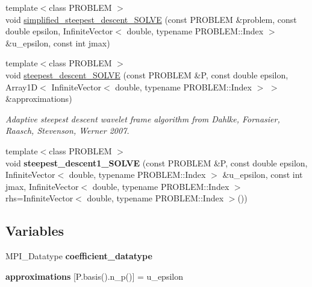 \begin{CompactItemize}
\item 
{\footnotesize template$<$class PROBLEM $>$ }\\void \hyperlink{namespaceFrameTL_c04ff1f80c162c3369928a2b45402beb}{simplified\_\-steepest\_\-descent\_\-SOLVE} (const PROBLEM \&problem, const double epsilon, InfiniteVector$<$ double, typename PROBLEM::Index $>$ \&u\_\-epsilon, const int jmax)
\item 
{\footnotesize template$<$class PROBLEM $>$ }\\void \hyperlink{namespaceFrameTL_b98b858d0561768f9494ac7f962a6857}{steepest\_\-descent\_\-SOLVE} (const PROBLEM \&P, const double epsilon, Array1D$<$ InfiniteVector$<$ double, typename PROBLEM::Index $>$ $>$ \&approximations)
\begin{CompactList}\small\item\em Adaptive steepest descent wavelet frame algorithm from Dahlke, Fornasier, Raasch, Stevenson, Werner 2007. \item\end{CompactList}\item 
\hypertarget{namespaceFrameTL_8c3c15901f82f99032dc5ed8b8d8ad46}{
{\footnotesize template$<$class PROBLEM $>$ }\\void \textbf{steepest\_\-descent1\_\-SOLVE} (const PROBLEM \&P, const double epsilon, InfiniteVector$<$ double, typename PROBLEM::Index $>$ \&u\_\-epsilon, const int jmax, InfiniteVector$<$ double, typename PROBLEM::Index $>$ rhs=InfiniteVector$<$ double, typename PROBLEM::Index $>$())}
\label{namespaceFrameTL_8c3c15901f82f99032dc5ed8b8d8ad46}

\end{CompactItemize}
\subsection*{Variables}
\begin{CompactItemize}
\item 
\hypertarget{namespaceFrameTL_ed8caef1981377375248b70b9df6b085}{
MPI\_\-Datatype \textbf{coefficient\_\-datatype}}
\label{namespaceFrameTL_ed8caef1981377375248b70b9df6b085}

\item 
\hypertarget{namespaceFrameTL_ecdb4ced7f7d4e5fde0db90a76dd3741}{
\textbf{approximations} \mbox{[}P.basis().n\_\-p()\mbox{]} = u\_\-epsilon}
\label{namespaceFrameTL_ecdb4ced7f7d4e5fde0db90a76dd3741}

\end{CompactItemize}


